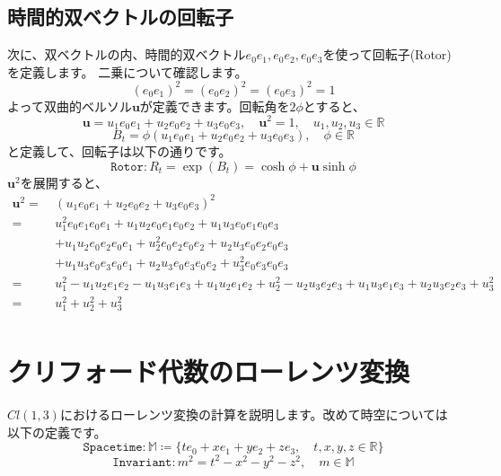 \documentclass[a4paper,12pt,notitlepage]{jsreport}
\begin{document}
\subsection{時間的双ベクトルの回転子}

次に、双ベクトルの内、時間的双ベクトル$e_0e_1,e_0e_2,e_0e_3$を使って回転子(Rotor)を定義します。
二乗について確認します。
\begin{equation}
  (e_0e_1)^2 = (e_0e_2)^2 = (e_0e_3)^2 = 1
\end{equation}
よって双曲的ベルソル$\bm{u}$が定義できます。回転角を$2\phi$とすると、
\begin{equation}
  \bm{u} = u_1 e_0e_1 + u_2 e_0e_2 + u_3 e_0e_3 , \quad
  \bm{u}^2 = 1 , \quad u_1 , u_2 , u_3 \in \mathbb{R}
\end{equation}
\begin{equation}
  B_t = \phi (u_1 e_0e_1 + u_2 e_0e_2 + u_3 e_0e_3) , \quad \phi \in \mathbb{R}
\end{equation}
と定義して、回転子は以下の通りです。
\begin{equation}
  \texttt{Rotor} : R_t = \exp(B_t) = \cosh \phi + \bm{u} \sinh \phi
\end{equation}
$\bm{u}^2$を展開すると、
\begin{equation}
  \begin{split}
    \bm{u}^2 = ~ & (u_1 e_0e_1 + u_2 e_0e_2 + u_3 e_0e_3)^2\\
    = ~ & u_1^2 e_0e_1e_0e_1 + u_1 u_2 e_0e_1e_0e_2 + u_1 u_3 e_0e_1e_0e_3\\
    & + u_1 u_2 e_0e_2e_0e_1 + u_2^2 e_0e_2e_0e_2 + u_2 u_3 e_0e_2e_0e_3\\
    & + u_1 u_3 e_0e_3e_0e_1 + u_2 u_3 e_0e_3e_0e_2 + u_3^2 e_0e_3e_0e_3\\
    = ~ & u_1^2 - u_1 u_2 e_1e_2 - u_1 u_3 e_1e_3
     + u_1 u_2 e_1e_2 + u_2^2 - u_2 u_3 e_2e_3
     + u_1 u_3 e_1e_3 + u_2 u_3 e_2e_3 + u_3^2\\
    = ~ & u_1^2 + u_2^2 + u_3^2\\
  \end{split}
\end{equation}

\section{クリフォード代数のローレンツ変換}

$Cl(1,3)$におけるローレンツ変換の計算を説明します。改めて時空については以下の定義です。
\begin{equation}
  \texttt{Spacetime}:\mathbb{M}\coloneq \{te_0+xe_1+ye_2+ze_3,\quad t,x,y,z\in\mathbb{R}\}
\end{equation}
\begin{equation}
  \texttt{Invariant}:m^2=t^2-x^2-y^2-z^2,\quad m\in\mathbb{M}
\end{equation}
\end{document}
